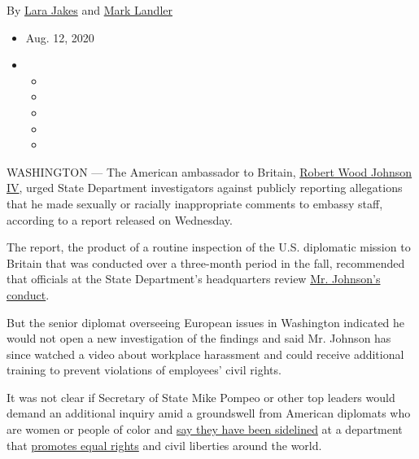 By \href{https://www.nytimes3xbfgragh.onion/by/lara-jakes}{Lara Jakes}
and \href{https://www.nytimes3xbfgragh.onion/by/mark-landler}{Mark
Landler}

\begin{itemize}
\item
  Aug. 12, 2020
\item
  \begin{itemize}
  \item
  \item
  \item
  \item
  \item
  \end{itemize}
\end{itemize}

WASHINGTON --- The American ambassador to Britain,
\href{https://www.nytimes3xbfgragh.onion/2017/01/19/us/politics/woody-johnson-trump-ambassador.html?action=click\&module=RelatedLinks\&pgtype=Article}{Robert
Wood Johnson IV}, urged State Department investigators against publicly
reporting allegations that he made sexually or racially inappropriate
comments to embassy staff, according to a report released on Wednesday.

The report, the product of a routine inspection of the U.S. diplomatic
mission to Britain that was conducted over a three-month period in the
fall, recommended that officials at the State Department's headquarters
review
\href{https://www.nytimes3xbfgragh.onion/2017/01/19/us/politics/woody-johnson-trump-ambassador.html?action=click\&module=RelatedLinks\&pgtype=Article}{Mr.
Johnson's conduct}.

But the senior diplomat overseeing European issues in Washington
indicated he would not open a new investigation of the findings and said
Mr. Johnson has since watched a video about workplace harassment and
could receive additional training to prevent violations of employees'
civil rights.

It was not clear if Secretary of State Mike Pompeo or other top leaders
would demand an additional inquiry amid a groundswell from American
diplomats who are women or people of color and
\href{https://www.nytimes3xbfgragh.onion/2020/06/27/us/politics/a-reckoning-with-race-to-ensure-diversity-for-americas-face-abroad.html}{say
they have been sidelined} at a department that
\href{https://www.nytimes3xbfgragh.onion/2020/06/06/us/politics/protests-diplomats-coronavirus.html}{promotes
equal rights} and civil liberties around the world.


